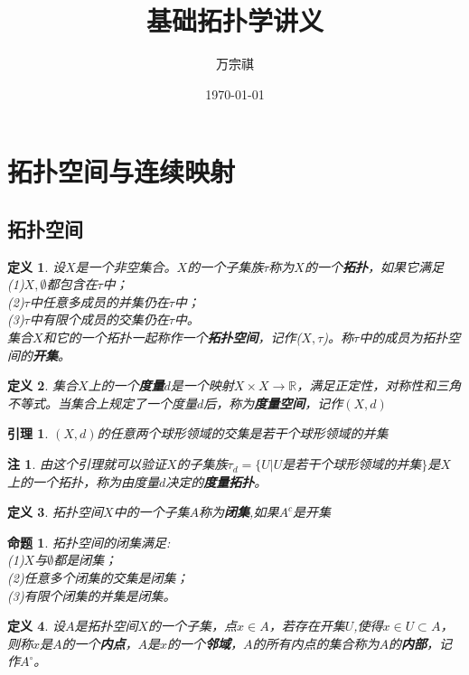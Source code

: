 \documentclass[UTF8]{ctexart}
\title{基础拓扑学讲义}
\author{万宗祺}
\date{\today}
\newtheorem{dfnt}{定义}
\newtheorem{lemma}{引理}
\newtheorem*{note}{注}
\newtheorem{pro}{命题}
\begin{document}
\maketitle
\tableofcontents
\section{拓扑空间与连续映射}
\subsection{拓扑空间}
\begin{dfnt}
设$X$是一个非空集合。$X$的一个子集族$\tau$称为$X$的一个\textbf{拓扑}，如果它满足\\ (1)$X,\emptyset$都包含在$\tau$中；\\(2)$\tau$中任意多成员的并集仍在$\tau$中；\\(3)$\tau$中有限个成员的交集仍在$\tau$中。\\集合$X$和它的一个拓扑一起称作一个\textbf{拓扑空间}，记作($X,\tau$)。称$\tau$中的成员为拓扑空间的\textbf{开集}。
\end{dfnt}
\begin{dfnt}
集合$X$上的一个\textbf{度量}$d$是一个映射$X \times X \rightarrow \mathbb{R}$，满足正定性，对称性和三角不等式。当集合上规定了一个度量$d$后，称为\textbf{度量空间}，记作$(X,d)$
\end{dfnt}
\begin{lemma}
$(X,d)$的任意两个球形领域的交集是若干个球形领域的并集
\end{lemma}
\begin{note}
由这个引理就可以验证$X$的子集族$\tau_d = \{U|U$是若干个球形领域的并集$\}$是$X$上的一个拓扑，称为由度量$d$决定的\textbf{度量拓扑}。
\end{note}
\begin{dfnt}
拓扑空间$X$中的一个子集$A$称为\textbf{闭集},如果$A^c$是开集
\end{dfnt}
\begin{pro}
拓扑空间的闭集满足:\\(1)$X$与$\emptyset$都是闭集；\\(2)任意多个闭集的交集是闭集；\\(3)有限个闭集的并集是闭集。
\end{pro}
\begin{dfnt}
设$A$是拓扑空间$X$的一个子集，点$x \in A$，若存在开集$U$,使得$x\in U \subset A$，则称$x$是$A$的一个\textbf{内点}，$A$是$x$的一个\textbf{邻域}，$A$的所有内点的集合称为$A$的\textbf{内部}，记作$A^{\circ}$。
\end{dfnt}
\end{document}
